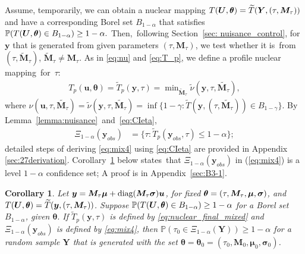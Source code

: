 \documentclass[12pt]{article}
\theoremstyle{shortspace}
\newtheorem{corollary}{Corollary}
\def\*#1{\bm{#1}}
\def\btheta{\mathop{\theta\kern-.45em\hbox{$\theta$}}\nolimits}
\def\P{\mathbb P}
\newcommand{\diag}{\hbox{diag}}
\begin{document}
Assume, temporarily, we can obtain a nuclear mapping $T(\*U, \btheta)= \widetilde T(\*Y, (\tau,{\*M_\tau}))$
and have a corresponding Borel set $B_{1 -\alpha}$ that satisfies $\P(T(\*U, \btheta) \in B_{1 -\alpha}) \geq 1- \alpha.$
Then,~following Section~\ref{sec: nuisance_control}, 
for $\*y$ that is generated from given parameters $(\tau, \*M_\tau)$, 
we test whether it is~from $ (\tau, \widetilde{\*M}_\tau)$,  $\widetilde{\*M}_\tau \not= \*M_\tau$. As in \eqref{eq:nu} and \eqref{eq:T_p}, we define a profile nuclear mapping~for~$\tau$: 
\begin{align}
\label{eq:nuclear_final_mixed}
    T_p(\*u, \*\theta) = \widetilde T_p(\*y, \tau) = \min\nolimits_{\widetilde{\*M}_\tau} \widetilde \nu(\*y, \tau,  \widetilde{\*M_\tau}), 
\end{align}
where $ \nu(\*u, \tau,  \widetilde{\*M_\tau})= \widetilde \nu(\*y, \tau,  \widetilde{\*M_\tau})  =  \inf\{1-\gamma: \widetilde T(\*y, (\tau,\widetilde{\*M_\tau})) \in B_{1-\gamma}\}.$
By Lemma~\ref{lemma:nuisance}~and~\eqref{eq:CIeta},
\begin{align}
\Xi_{1-\alpha}(\*y_{obs})   & = 
     \big\{\tau: \widetilde T_p(\*y_{obs},\tau)\leq 1-\alpha \big\};
   \label{eq:mix4}
\end{align}
detailed steps of deriving \eqref{eq:mix4} using \eqref{eq:CIeta} are provided in Appendix \ref{sec:27derivation}. 
Corollary~\ref{cor:mix4_new} below states~that $\Xi_{1-\alpha}(\*y_{obs})$ in (\ref{eq:mix4}) is a 
level $1 - \alpha$ confidence set; A proof is in Appendix~\ref{sec:B3-1}.
\begin{corollary}
\label{cor:mix4_new}
Let $\*y =\*M_{\tau} \*\mu + \diag(\*M_\tau  {\*\sigma}) \*u$,  for fixed $\btheta = (\tau,{\*M_\tau}, \*\mu, \*\sigma)$, and $T(\*U, \btheta) = \widetilde T(\*y,  (\tau,{\*M_\tau}))$. Suppose $\P(T(\*U, \btheta) \in B_{1 -\alpha}) \geq 1- \alpha$ for a Borel set $B_{1 -\alpha}$, given $\*\theta.$  If  $\widetilde T_p(\*y, \tau)$ is defined by \eqref{eq:nuclear_final_mixed} and $\Xi_{1-\alpha}(\*y_{obs})$  is defined by \eqref{eq:mix4}, then $\P(\tau_0 \in \Xi_{1-\alpha}(\*Y)) \geq 1-\alpha$ for a random sample $\*Y$ that is generated with the set $\*\theta = \*\theta_0 = (\tau_0, {\*M_0}, \*\mu_0, \*\sigma_0)$. 
\end{corollary}
\end{document}
